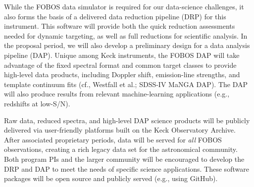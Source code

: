 \documentclass[oneside,11pt]{amsart}
\begin{document}
While the FOBOS data simulator is required for our data-science challenges, it also forms the basis of a delivered data
reduction pipeline (DRP) for this instrument.  This software will provide both the quick reduction assessments needed
for dynamic targeting, as well as full reductions for scientific analysis.  In the proposal period, we will also develop a preliminary design for a data analysis
pipeline (DAP).  Unique among Keck instruments, the FOBOS DAP will take advantage of the fixed spectral format and common target classes to provide high-level data products, including
Doppler shift, emission-line strengths, and template continuum fits (cf.,
Westfall et al.; SDSS-IV MaNGA DAP).  The DAP will also produce results from relevant machine-learning applications (e.g., redshifts at low-S/N).

Raw data, reduced spectra, and high-level DAP science products will be
publicly delivered via user-friendly platforms built on the Keck Observatory Archive.  After associated
proprietary periods, data will be served for {\it all} FOBOS observations, creating a rich legacy data set for the astronomical community.  Both program PIs
and the larger community will be encouraged to develop the DRP and DAP
to meet the needs of specific science applications.  These software
packages will be open source and publicly served (e.g., using GitHub).


\end{document}
